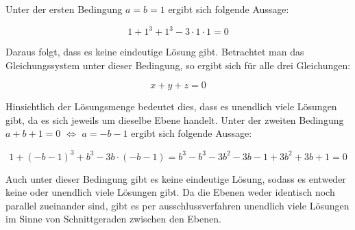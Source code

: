 \documentclass[11pt]{article}
\begin{document}
    Unter der ersten Bedingung $a = b = 1$ ergibt sich folgende Aussage:

    \[
    1 + 1^3 + 1^3 - 3 \cdot 1 \cdot 1 = 0
    \]

    Daraus folgt, dass es keine eindeutige Lösung gibt.
    Betrachtet man das Gleichungssystem unter dieser Bedingung, so ergibt sich für alle drei Gleichungen:

    \[
        x + y + z = 0
    \]

    Hinsichtlich der Lösungsmenge bedeutet dies, dass es unendlich viele Lösungen gibt, da es sich jeweils um dieselbe Ebene handelt.
    \bigskip
    Unter der zweiten Bedingung $a + b + 1 = 0$ $\Leftrightarrow$ $a= -b-1$ ergibt sich folgende Aussage:

    \[
        1 + (-b-1)^3 + b^3 - 3b \cdot (-b-1) = b^3 - b^3 -3b^2 -3b - 1 + 3b^2 + 3b + 1 = 0
    \]

    Auch unter dieser Bedingung gibt es keine eindeutige Lösung, sodass es entweder keine oder unendlich viele Lösungen gibt.
    Da die Ebenen weder identisch noch parallel zueinander sind, gibt es per ausschlussverfahren unendlich viele
    Lösungen im Sinne von Schnittgeraden zwischen den Ebenen.

    
    
\end{document}
